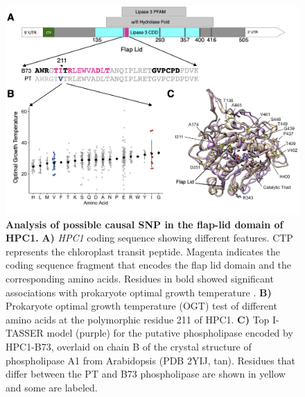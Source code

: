 \documentclass[9pt,twocolumn,twoside,lineno]{biorxiv}
\newcommand{\hpc}{\textit{HPC1}\xspace}
\begin{document}
\begin{figure}[ht]
\centering
\includegraphics[width=0.4\paperwidth]{Figures/Fig_5.png}
\caption{\textbf{Analysis of possible causal SNP in the flap-lid domain of HPC1.} 
\textbf{A)} \hpc coding sequence showing different features. 
CTP represents the chloroplast transit peptide. 
Magenta indicates the coding sequence fragment that encodes the flap lid domain and the corresponding amino acids.
Residues in bold showed significant associations with prokaryote optimal growth temperature \cite{Jensen2021-iv, Jensen2021-zm}.
\textbf{B)} Prokaryote optimal growth temperature (OGT) test of different amino acids at the polymorphic residue 211 of HPC1.
\textbf{C)} Top I-TASSER model (purple) for the putative phospholipase encoded by HPC1-B73, overlaid on chain B of the crystal structure of phospholipase A1 from
Arabidopsis (PDB 2YIJ, tan). 
Residues that differ between the PT and B73 phospholipase are shown in yellow and some are labeled.} 
\label{Fig5}
\end{figure}
\end{document}
